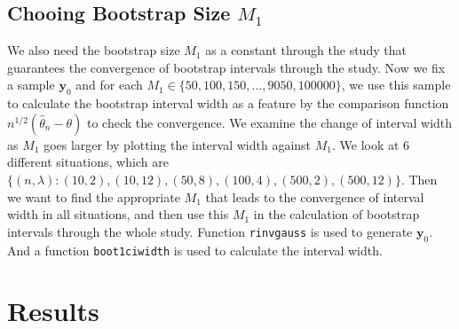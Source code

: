 \documentclass{article}
\begin{document}
	\subsection{Chooing Bootstrap Size $M_1$}
	We also need the bootstrap size $M_1$ as a constant through the study that guarantees the convergence of bootstrap intervals through the study. Now we fix a sample $\bm y_0$ and for each $M_1 \in \{50, 100, 150, \ldots, 9050, 100000\}$, we use this sample to calculate the bootstrap interval width as a feature by the comparison function $n^{1/2}(\hat{\theta}_n - \theta)$ to check the convergence. We examine the change of interval width as $M_1$ goes larger by plotting the interval width against $M_1$.  We look at 6 different situations, which are $\{(n, \lambda): (10, 2), (10, 12), (50, 8), (100, 4), (500, 2), (500, 12)\}$. Then we want to find the appropriate $M_1$ that leads to the convergence of interval width in all situations, and then use this $M_1$ in the calculation of bootstrap intervals through the whole study. Function \verb|rinvgauss| is used to generate $\bm y_0$. And a function \verb|boot1ciwidth| is used to calculate the interval width.       

	\section{Results}
\end{document}
